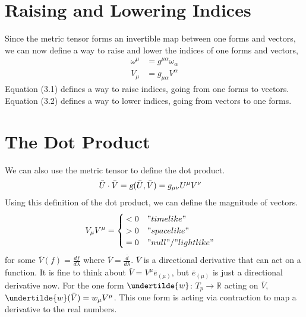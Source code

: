 \documentclass[11pt]{article}
\begin{document}
\newpage

    \section{Raising and Lowering Indices}
    Since the metric tensor forms an invertible map between one forms and vectors, we can now define a way to raise and lower the indices of one forms and vectors, 
        \begin{equation}
            \begin{aligned}
            \omega^\mu &= g^{\mu\alpha} \omega_\alpha
            \end{aligned}
        \end{equation}
         \begin{equation}
            \begin{aligned}
            V_\mu &= g_{\mu\alpha} V^\alpha
            \end{aligned}
        \end{equation}
    Equation (3.1) defines a way to raise indices, going from one forms to vectors. Equation (3.2) defines a way to lower indices, going from vectors to one forms.
    
    \section{The Dot Product}
    We can also use the metric tensor to define the dot product. 
        \begin{equation}
            \begin{aligned}
            \bar{U} \cdot \bar{V} &= \textsl{g}(\bar{U}, \bar{V}) = g_{\mu\nu} U^\mu V^\nu
            \end{aligned}
        \end{equation}
    Using this definition of the dot product, we can define the magnitude of vectors. 
        \begin{equation}
            \begin{aligned}
            V_\mu V^\mu &= \begin{cases} 
                            < 0 & "timelike" \\
                            > 0 & "spacelike" \\
                            = 0 & "null"/"lightlike" 
                            \end{cases}
            \end{aligned}
        \end{equation}
    for some $\bar{V}(f) = \frac{df}{d\lambda}$ where $\bar{V} = \frac{\bar{d}}{d\lambda}$. $\bar{V}$ is a directional derivative that can act on a function. It is fine to think about $\bar{V} = V^\mu \bar{e}_{(\mu)}$, but $\bar{e}_{(\mu)}$ is just a directional derivative now. For the one form $\undertilde{w}$: $T_{p} \to \mathbb{R}$ acting on $\bar{V}$, $\undertilde{w}(\bar{V}) = w_\mu V^\mu$. This one form is acting via contraction to map a derivative to the real numbers. 
    
\end{document}
